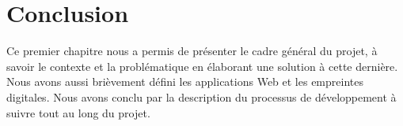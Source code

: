 \vspace{-30pt}
\section{Conclusion}
Ce premier chapitre nous a permis de présenter le cadre général du projet, à
savoir le contexte et la problématique en élaborant une solution à cette
dernière. Nous avons aussi brièvement défini les applications Web et les
empreintes digitales. Nous avons conclu par la description du processus de
développement à suivre tout au long du projet.
